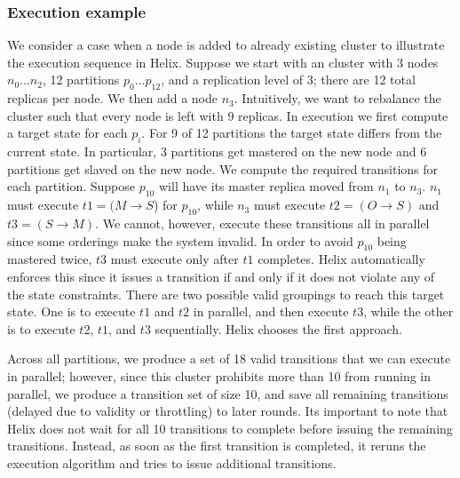
\subsubsection{Execution example}
%
We consider a case when a node is added to already existing
cluster to illustrate the execution sequence in Helix.
Suppose we start with an \ES cluster with 3 nodes $n_0 \ldots n_2$, 12
partitions $p_0 \ldots p_{12}$, and a replication level of 3; there are 12 total
replicas per node.  We then add a node $n_3$. 
Intuitively, we want to rebalance the cluster such that every node is left with
9 replicas.  In \helix execution we first compute a target state for each
$p_i$.  For 9 of 12 partitions the target state differs from the current state.  In
particular, 3 partitions get mastered on the new node and 6 partitions get
slaved on the new node.  We compute the required transitions for each partition.
Suppose $p_{10}$ will have its master replica moved from $n_1$ to $n_3$.  $n_1$
must execute $t1=(M \rightarrow S$) for $p_{10}$, while $n_3$ must execute $t2=(O
\rightarrow S)$ and $t3=(S \rightarrow M)$.  We cannot, however, execute these
transitions all in parallel since some orderings make the system invalid.
In order to avoid $p_{10}$ being mastered twice, $t3$ must execute only after
$t1$ completes. Helix automatically enforces this since it
issues a transition if and only if it does not violate any of the
state constraints. There are two possible valid groupings to reach this target
state. One is to execute $t1$ and $t2$ in
parallel, and then execute $t3$, while the other is to execute $t2$, $t1$, and $t3$
sequentially. Helix chooses
the first approach.
 
Across all partitions, we produce
a set of 18 valid transitions that we can execute in parallel; however, since 
this \ES cluster prohibits more than 10 from running in parallel, 
we produce a transition set of size 10, and save all remaining transitions
(delayed due to validity or throttling) to later rounds. Its important to note that
Helix does not wait for all 10 transitions to complete before issuing the
remaining transitions. Instead, as soon as the first transition is completed, it
reruns the execution algorithm and tries to issue additional transitions. 





